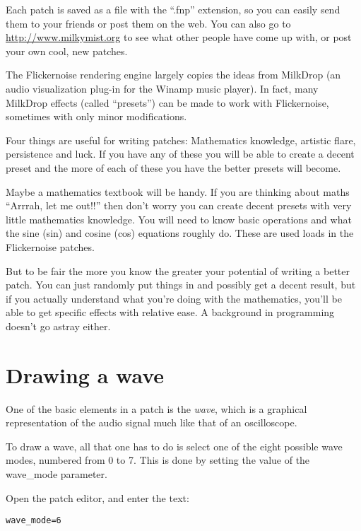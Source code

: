 \documentclass[11pt, a5paper, pagesize]{scrbook}
\begin{document}
Each patch is saved as a file with the ``.fnp'' extension, so you can easily send them to your friends or post them on the web. You can also go to \url{http://www.milkymist.org} to see what other people have come up with, or post your own cool, new patches.

The Flickernoise rendering engine largely copies the ideas from MilkDrop (an audio visualization plug-in for the Winamp music player). In fact, many MilkDrop effects (called ``presets'') can be made to work with Flickernoise, sometimes with only minor modifications.

Four things are useful for writing patches: Mathematics knowledge, artistic flare, persistence and luck. If you have any of these you will be able to create a decent preset and the more of each of these you have the better presets will become. 

Maybe a mathematics textbook will be handy. If you are thinking about maths ``Arrrah, let me out!!'' then don't worry you can create decent presets with very little mathematics knowledge. You will need to know basic operations and what the sine (sin) and cosine (cos) equations roughly do. These are used loads in the Flickernoise patches.

But to be fair the more you know the greater your potential of writing a better patch. You can just randomly put things in and possibly get a decent result, but if you actually understand what you're doing with the mathematics, you'll be able to get specific effects with relative ease. A background in programming doesn't go astray either.

\section{Drawing a wave}
One of the basic elements in a patch is the \textit{wave}, which is a graphical representation of the audio signal much like that of an oscilloscope.

To draw a wave, all that one has to do is select one of the eight possible wave modes, numbered from 0 to 7. This is done by setting the value of the wave\_mode parameter.

Open the patch editor, and enter the text:

\begin{verbatim}
wave_mode=6
\end{verbatim}

\end{document}

